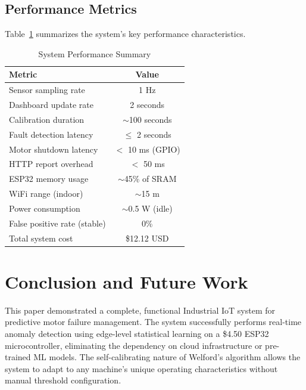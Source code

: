 \documentclass[conference]{IEEEtran}
\begin{document}
\vspace{0.3cm}
\noindent{}
\vspace{0.2cm}

\subsection{Performance Metrics}

Table~\ref{tab:performance} summarizes the system's key performance characteristics.

\begin{table}[H]
\centering
\caption{System Performance Summary}
\label{tab:performance}
\begin{tabular}{|l|c|}
\hline
\textbf{Metric} & \textbf{Value} \\
\hline
Sensor sampling rate & 1 Hz \\
Dashboard update rate & 2 seconds \\
Calibration duration & $\sim$100 seconds \\
Fault detection latency & $\leq$ 2 seconds \\
Motor shutdown latency & $<$ 10 ms (GPIO) \\
HTTP report overhead & $<$ 50 ms \\
ESP32 memory usage & $\sim$45\% of SRAM \\
WiFi range (indoor) & $\sim$15 m \\
Power consumption & $\sim$0.5 W (idle) \\
False positive rate (stable) & 0\% \\
Total system cost & \$12.12 USD \\
\hline
\end{tabular}
\end{table}

\section{Conclusion and Future Work}

This paper demonstrated a complete, functional Industrial IoT system for predictive motor failure management. The system successfully performs real-time anomaly detection using edge-level statistical learning on a \$4.50 ESP32 microcontroller, eliminating the dependency on cloud infrastructure or pre-trained ML models. The self-calibrating nature of Welford's algorithm allows the system to adapt to any machine's unique operating characteristics without manual threshold configuration.
\end{document}
